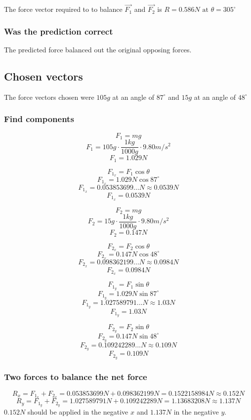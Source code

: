\documentclass[11pt, letterpaper, includehead]{article}
\begin{document}
The force vector required to to balance $\vec{F_1}$ and $\vec{F_2}$ is
$R = 0.586N \text{ at } \theta = 305^{\circ}$

\subsubsection{Was the prediction correct} %
The predicted force balanced out the original opposing forces. 

\subsection{Chosen vectors} %
The force vectors chosen were $105g$ at an angle of $87^{\circ}$ and $15g$ at an angle of $48^{\circ}$

\subsubsection{Find components} %
\begin{multicols}{2}
  $$F_1 = mg$$
  $$F_1 = 105g \cdot \frac{1kg}{1000g} \cdot 9.80m/s^2$$
  $$F_1 = 1.029N$$

  $$F_{1_x} = F_1\cos\theta$$
  $$F_{1_x} = 1.029N\cos87^{\circ}$$
  $$F_{1_x} = 0.053853699...N \approx 0.0539N$$
  $$\boxed{F_{1_x} = 0.0539N}$$

  \columnbreak
  $$F_2 = mg$$
  $$F_2 = 15g \cdot \frac{1kg}{1000g} \cdot 9.80m/s^2$$
  $$F_2 = 0.147N$$

  $$F_{2_x} = F_2\cos\theta$$
  $$F_{2_x} = 0.147N\cos48^{\circ}$$
  $$F_{2_x} = 0.098362199...N \approx 0.0984N$$
  $$\boxed{F_{2_x} = 0.0984N}$$
 
\end{multicols}

\begin{multicols}{2}

  $$F_{1_y} = F_1\sin\theta$$
  $$F_{1_y} = 1.029N\sin87^{\circ}$$
  $$F_{1_y} = 1.027589791...N \approx 1.03N$$
  $$\boxed{F_{1_y} = 1.03N}$$

  \columnbreak
  $$F_{2_y} = F_2\sin\theta$$
  $$F_{2_y} = 0.147N\sin48^{\circ}$$
  $$F_{2_y} = 0.109242289...N \approx 0.109N$$
  $$\boxed{F_{2_y} = 0.109N}$$
 
\end{multicols}

\subsubsection{Two forces to balance the net force} %
$$R_x = F_{1_x} + F_{2_x} = 0.053853699N + 0.098362199N = 0.1522158984N \approx \boxed{0.152N}$$
$$R_y = F_{1_y} + F_{2_y} = 1.027589791N + 0.109242289N = 1.13683208N \approx \boxed{1.137N}$$
$0.152N$ should be applied in the negative $x$ and $1.137N$ in the negative $y$.
\end{document}
